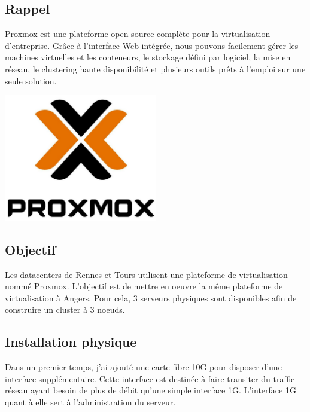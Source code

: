 \documentclass[12pt, a4paper, twoside]{article}
\begin{document}
\subsection{Rappel}
\noindent%
\begin{minipage}{.7\textwidth}%
\gls{Proxmox} est une plateforme open-source complète pour la virtualisation d'entreprise. 
Grâce à l'interface Web intégrée, nous pouvons facilement gérer les machines virtuelles et les conteneurs, le stockage défini par logiciel, la mise en réseau, le clustering haute disponibilité et plusieurs outils prêts à l'emploi sur une seule solution.

\end{minipage}%
\hfill
\begin{minipage}{.3\textwidth}%
\begin{center}
\includegraphics[width=0.5\textwidth]{src/logo_proxmox.jpg}
\end{center}
\end{minipage}%


\subsection{Objectif}
Les datacenters de Rennes et Tours utilisent une plateforme de virtualisation nommé \gls{Proxmox}. 
L'objectif est de mettre en oeuvre la même plateforme de virtualisation à Angers. 
Pour cela, 3 serveurs physiques sont disponibles afin de construire un \gls{cluster} à 3 noeuds.

\subsection{Installation physique}
Dans un premier temps, j'ai ajouté une carte fibre 10G pour disposer d'une interface supplémentaire. 
Cette interface est destinée à faire transiter du traffic réseau ayant besoin de plus de débit qu'une simple interface 1G. 
L'interface 1G quant à elle sert à l'administration du serveur.
\end{document}
